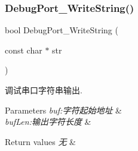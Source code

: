 \subsubsection{\texorpdfstring{Debug\+Port\+\_\+\+Write\+String()}{DebugPort\_WriteString()}}
{\footnotesize\ttfamily bool Debug\+Port\+\_\+\+Write\+String (\begin{DoxyParamCaption}\item[{const char $\ast$}]{str }\end{DoxyParamCaption})}



调试串口字符串输出. 


\begin{DoxyParams}{Parameters}
{\em buf\+:字符起始地址} & \\
\hline
{\em buf\+Len\+:输出字符长度} & \\
\hline
\end{DoxyParams}

\begin{DoxyRetVals}{Return values}
{\em 无} & \\
\hline
\end{DoxyRetVals}
